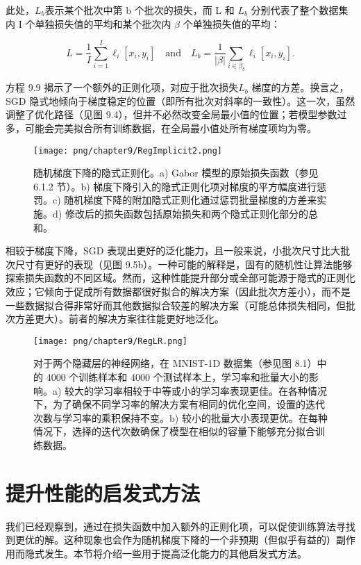 此处，\(L_b\)表示某个批次中第 b 个批次的损失，而 L 和 \(L_b\) 分别代表了整个数据集内 I 个单独损失值的平均和某个批次内 \(\beta\) 个单独损失值的平均：

\begin{equation}
L = \frac{1}{I} \sum_{i=1}^{I} \ell_i[x_i, y_i] \quad \text{and} \quad L_b = \frac{1}{|\beta|} \sum_{i \in \beta_b} \ell_i[x_i, y_i]. 
\end{equation}

方程 9.9 揭示了一个额外的正则化项，对应于批次损失\(L_b\) 梯度的方差。换言之，SGD 隐式地倾向于梯度稳定的位置（即所有批次对斜率的一致性）。这一次，虽然调整了优化路径（见图 9.4），但并不必然改变全局最小值的位置；若模型参数过多，可能会完美拟合所有训练数据，在全局最小值处所有梯度项均为零。

\begin{figure}[ht!]
	\centering
	\texttt{[image: png/chapter9/RegImplicit2.png]}
	\caption{随机梯度下降的隐式正则化。a) Gabor 模型的原始损失函数（参见 6.1.2 节）。b) 梯度下降引入的隐式正则化项对梯度的平方幅度进行惩罚。c) 随机梯度下降的附加隐式正则化通过惩罚批量梯度的方差来实施。d) 修改后的损失函数包括原始损失和两个隐式正则化部分的总和。}
\end{figure}


相较于梯度下降，SGD 表现出更好的泛化能力，且一般来说，小批次尺寸比大批次尺寸有更好的表现（见图 9.5b）。一种可能的解释是，固有的随机性让算法能够探索损失函数的不同区域。然而，这种性能提升部分或全部可能源于隐式的正则化效应；它倾向于促成所有数据都很好拟合的解决方案（因此批次方差小），而不是一些数据拟合得非常好而其他数据拟合较差的解决方案（可能总体损失相同，但批次方差更大）。前者的解决方案往往能更好地泛化。

\begin{figure}[ht!]
	\centering
	\texttt{[image: png/chapter9/RegLR.png]}
	\caption{对于两个隐藏层的神经网络，在 MNIST-1D 数据集（参见图 8.1）中的 4000 个训练样本和 4000 个测试样本上，学习率和批量大小的影响。a) 较大的学习率相较于中等或小的学习率表现更佳。在各种情况下，为了确保不同学习率的解决方案有相同的优化空间，设置的迭代次数与学习率的乘积保持不变。b) 较小的批量大小表现更优。在每种情况下，选择的迭代次数确保了模型在相似的容量下能够充分拟合训练数据。}
\end{figure}


\section{提升性能的启发式方法}
我们已经观察到，通过在损失函数中加入额外的正则化项，可以促使训练算法寻找到更优的解。这种现象也会作为随机梯度下降的一个非预期（但似乎有益的）副作用而隐式发生。本节将介绍一些用于提高泛化能力的其他启发式方法。
